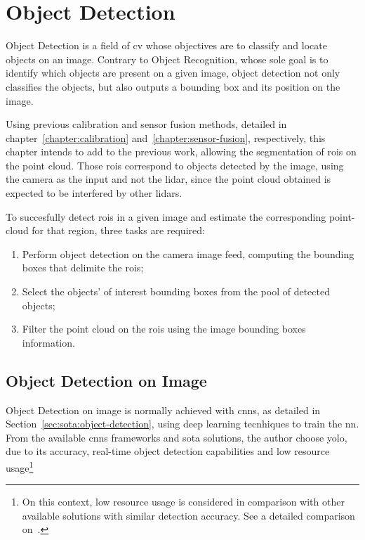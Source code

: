\chapter{Object Detection}
\label{chapter:object-detection}

Object Detection is a field of \acf{cv} whose objectives are to classify and locate objects on an image. Contrary to Object Recognition, whose sole goal is to identify which objects are present on a given image, object detection not only classifies the objects, but also outputs a bounding box and its position on the image. 

Using previous calibration and sensor fusion methods, detailed in chapter~\ref{chapter:calibration} and~\ref{chapter:sensor-fusion}, respectively, this chapter intends to add to the previous work, allowing the segmentation of \acfp{roi} on the point cloud. Those \acp{roi} correspond to objects detected by the image, using the camera as the input and not the \ac{lidar}, since the point cloud obtained is expected to be interfered by other \acp{lidar}.

To succesfully detect \acp{roi} in a given image and estimate the corresponding point-cloud for that region, three tasks are required: 
\begin{enumerate}
	\item Perform object detection on the camera image feed, computing the bounding boxes that delimite the \acp{roi};
	\item Select the objects' of interest bounding boxes from the pool of detected objects;
	\item Filter the point cloud on the \acp{roi} using the image bounding boxes information.
\end{enumerate}

\section{Object Detection on Image}
\label{sec:object-detection:image}

Object Detection on image is normally achieved with \acfp{cnn}, as detailed in Section~\ref{sec:sota:object-detection}, using deep learning tecnhiques to train the \acl{nn}. From the available \acp{cnn} frameworks and \acl{sota} solutions, the author choose \ac{yolo}, due to its accuracy, real-time object detection capabilities and low resource usage\footnote{On this context, low resource usage is considered in comparison with other available solutions with similar detection accuracy. See a detailed comparison on~\cite{Redmon2018}.}~\cite{Redmon2016, Redmon2017}

